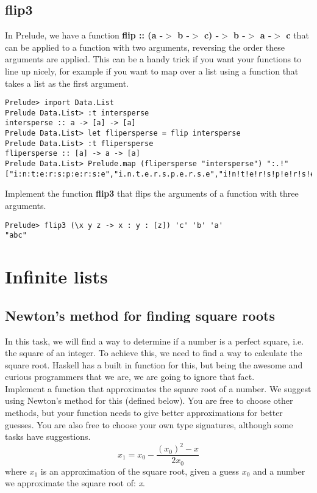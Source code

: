 \documentclass{article}
\begin{document}
\subsection{flip3}
In Prelude, we have a function \textbf{flip :: (a -$>$ b -$>$ c) -$>$ b -$>$ a -$>$ c} that can be applied to a function with two arguments, reversing the order these arguments are applied. This can be a handy trick if you want your functions to line up nicely, for example if you want to map over a list using a function that takes a list as the first argument.
\begin{lstlisting}
Prelude> import Data.List
Prelude Data.List> :t intersperse
intersperse :: a -> [a] -> [a]
Prelude Data.List> let flipersperse = flip intersperse
Prelude Data.List> :t flipersperse
flipersperse :: [a] -> a -> [a]
Prelude Data.List> Prelude.map (flipersperse "intersperse") ":.!"
["i:n:t:e:r:s:p:e:r:s:e","i.n.t.e.r.s.p.e.r.s.e","i!n!t!e!r!s!p!e!r!s!e"]
\end{lstlisting}
Implement the function \textbf{flip3} that flips the arguments of a function with three arguments.
\begin{lstlisting}
Prelude> flip3 (\x y z -> x : y : [z]) 'c' 'b' 'a'
"abc"
\end{lstlisting}

\section{Infinite lists}
\subsection{Newton's method for finding square roots}
In this task, we will find a way to determine if a number is a perfect square, i.e. the square of an integer. To achieve this, we need to find a way to calculate the square root. Haskell has a built in function for this, but being the awesome and curious programmers that we are, we are going to ignore that fact.\\
Implement a function that approximates the square root of a number. We suggest using Newton's method for this (defined below). You are free to choose other methods, but your function needs to give better approximations for better guesses. You are also free to choose your own type signatures, although some tasks have suggestions.
\[x_1 = x_0-\frac{(x_0)^2-x}{2x_0}\]
where $x_1$ is an approximation of the square root, given a guess $x_0$ and a number we approximate the square root of: \textit{x}.
\end{document}

